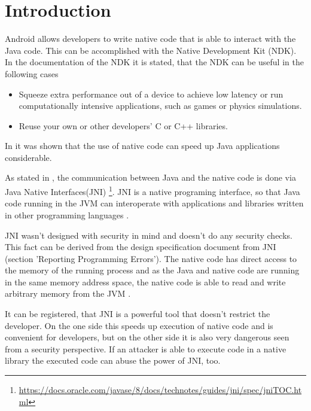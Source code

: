 \section{Introduction}

Android allows developers to write native code that is able to interact with the Java code. This can be accomplished with the Native Development Kit (NDK). In the documentation of the NDK it is stated, that the NDK can be useful in the following cases \cite{AndroidNdkIntro}

\begin{itemize}
	\item Squeeze extra performance out of a device to achieve low latency or run computationally intensive applications, such as games or physics simulations.
	\item Reuse your own or other developers' C or C++ libraries. 
\end{itemize}

In \cite{5669738} it was shown that the use of native code can speed up Java applications considerable.

As stated in \cite{AndroidNdkIntro} , the communication between Java and the native code is done via Java Native Interfaces(JNI) \footnote{\url{https://docs.oracle.com/javase/8/docs/technotes/guides/jni/spec/jniTOC.html}}. 
JNI is a native programing interface, so that Java code running in the JVM can interoperate with applications and libraries written in other programming languages \cite{JNISpecChapter1}.

JNI wasn't designed with security in mind and doesn't do any security checks. This fact can be derived from the design specification document from JNI (section 'Reporting Programming Errors')\cite{JNISpecChapter2}.
The native code has direct access to the memory of the running process and
as the Java and native code are running in the same memory address space, the native code is able to read and write arbitrary memory from the JVM \cite[p. 2]{Afonso2016GoingNU}.

It can be registered, that JNI is a powerful tool that doesn't restrict the developer. On the one side this speeds up execution of native code and is convenient for developers, but on the other side it is also very dangerous seen from a security perspective.
If an attacker is able to execute code in a native library the executed code can abuse the power of JNI, too.\\

